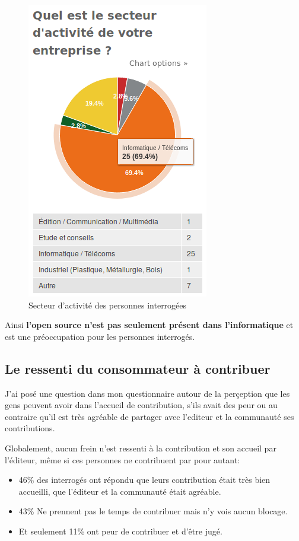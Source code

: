 			\begin{figure}[ht]
				\center
				\includegraphics[scale=0.58]{./img/a1}
				\caption{Secteur d'activité des personnes interrogées}
			\end{figure}

			Ainsi \textbf{l'open source n'est pas seulement présent dans l'informatique} et est une préoccupation pour les personnes interrogés.

		\subsection{Le ressenti du consommateur à contribuer}

			J'ai posé une question dans mon questionnaire autour de la perçeption que les gens peuvent avoir dans l'accueil de contribution, s'ils avait des peur ou au contraire qu'il est très agréable de partager avec l'editeur et la communauté ses contributions.

			Globalement, aucun frein n'est ressenti à la contribution et son accueil par l'éditeur, même si ces personnes ne contribuent par pour autant:

			\begin{itemize}[label=\textbullet, font=\LARGE \color{burntorange}]
				\item 46\% des interrogés ont répondu que leurs contribution était très bien accueilli, que l'éditeur et la communauté était agréable.
				\item 43\% Ne prennent pas le temps de contribuer mais n'y vois aucun blocage.
				\item Et seulement 11\% ont peur de contribuer et d'être jugé.
			\end{itemize}

